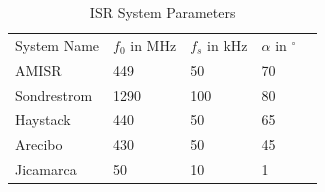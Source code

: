 \begin{table}[!h]
\centering
\caption{ISR System Parameters}
\label{tab:ISRsys}
\begin{tabular}{lllll}
System Name & $f_0$ in MHz & $f_s$ in kHz & $\alpha$ in $^\circ$ &  \\
AMISR       & 449          & 50           & 70               &  \\
Sondrestrom & 1290         & 100          & 80               &  \\
Haystack    & 440          & 50           & 65               &  \\
Arecibo     & 430          & 50           & 45               &  \\
Jicamarca   & 50           & 10           & 1                & 
\end{tabular}
\end{table}